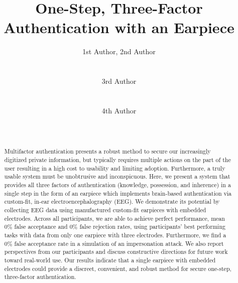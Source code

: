 \documentclass{sigchi}
\begin{document}
\title{One-Step, Three-Factor Authentication with an Earpiece}

\author{
  \alignauthor 1st Author, 2nd Author\\
    \\
    \\
  \alignauthor 3rd Author\\
    \\
    \\
  \alignauthor 4th Author\\
    \\
    \\
}

\maketitle

\begin{abstract}
 Multifactor authentication presents a robust method to secure our increasingly digitized private information, but typically requires multiple actions on the part of the user resulting in a high cost to usability and limiting adoption. Furthermore, a truly usable system must be unobtrusive and inconspicuous. Here, we present a system that provides all three factors of authentication (knowledge, possession, and inherence) in a single step in the form of an earpiece which implements brain-based authentication via custom-fit, in-ear electroencephalography (EEG). We demonstrate its potential by collecting EEG data using manufactured custom-fit earpieces with embedded electrodes. Across all participants, we are able to achieve perfect performance, mean 0\% false acceptance and 0\% false rejection rates, using participants' best performing tasks with data from only one earpiece with three electrodes. Furthermore, we find a 0\% false acceptance rate in a simulation of an impersonation attack. We also report perspectives from our participants and discuss constructive directions for future work toward real-world use. Our results indicate that a single earpiece with embedded electrodes could provide a discreet, convenient, and robust method for secure one-step, three-factor authentication.
\end{abstract}

\end{document}
